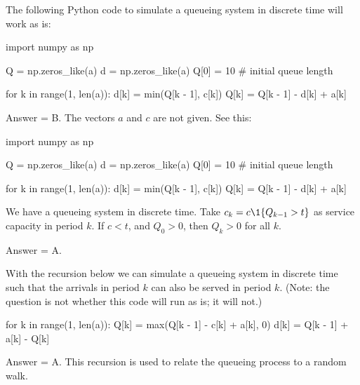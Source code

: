 \begin{exercise}[201902]
The following Python code to simulate a queueing system in discrete time will work as is: 


\begin{pyverbatim}
import numpy as np

Q = np.zeros_like(a)
d = np.zeros_like(a)
Q[0] = 10 # initial queue length

for k in range(1, len(a)):
 d[k] = min(Q[k - 1], c[k])
 Q[k] = Q[k - 1] - d[k] + a[k]

\end{pyverbatim}

\begin{solution}
 Answer = B. The vectors $a$ and $c$ are not given. See this:

\begin{pyconsole}
import numpy as np

Q = np.zeros_like(a)
d = np.zeros_like(a)
Q[0] = 10 # initial queue length

for k in range(1, len(a)):
 d[k] = min(Q[k - 1], c[k])
 Q[k] = Q[k - 1] - d[k] + a[k]

\end{pyconsole}
 
\end{solution}
\end{exercise}

\begin{exercise}[201902]
 We have a queueing system in discrete time. Take $c_k = c\1{Q_{k-1} > t}$ as service capacity in period $k$. If $c < t$, and $Q_0 > 0$, then $Q_k > 0$ for all $k$. 
\begin{solution}
Answer = A.
\end{solution}
\end{exercise}

\begin{exercise}[201902]
 With the recursion below we can simulate a queueing system in discrete time such that the arrivals in period $k$ can also be served in period $k$.
 (Note: the question is not whether this code will run as is; it will not.)
\begin{pyverbatim}
for k in range(1, len(a)):
 Q[k] = max(Q[k - 1] - c[k] + a[k], 0)
 d[k] = Q[k - 1] + a[k] - Q[k]

\end{pyverbatim}

\begin{solution}
Answer = A. This recursion is used to relate the queueing process to a random walk.
\end{solution}
\end{exercise}

